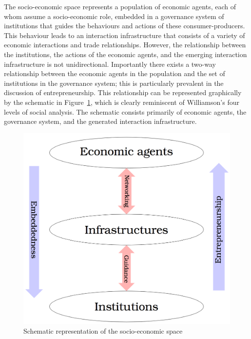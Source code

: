 The socio-economic space represents a population of economic agents, each of whom assume a socio-economic role, embedded in a governance system of institutions that guides the behaviours and actions of these consumer-producers. This behaviour leads to an interaction infrastructure that consists of a variety of economic interactions and trade relationships. However, the relationship between the institutions, the actions of the economic agents, and the emerging interaction infrastructure is not unidirectional. Importantly there exists a two-way relationship between the economic agents in the population and the set of institutions in the governance system; this is particularly prevalent in the discussion of entrepreneurship. This relationship can be represented graphically by the schematic in Figure~\ref{spacestructure}, which is clearly reminiscent of Williamson's four levels of social analysis. The schematic consists primarily of economic agents, the governance system, and the generated interaction infrastructure.

\begin{figure}[t]
\centering
\includegraphics[scale=0.25]{Images/structure-space.png}
\caption{Schematic representation of the socio-economic space}
\label{spacestructure}
\end{figure}

